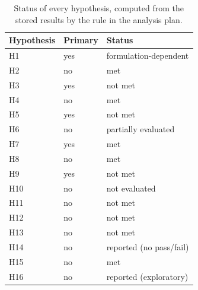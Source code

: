 \begin{table}[t]
\centering\small
\begin{tabular}{llp{5cm}}
\toprule
Hypothesis & Primary & Status \\
\midrule
H1 & yes & formulation-dependent \\
H2 & no & met \\
H3 & yes & not met \\
H4 & no & met \\
H5 & yes & not met \\
H6 & no & partially evaluated \\
H7 & yes & met \\
H8 & no & met \\
H9 & yes & not met \\
H10 & no & not evaluated \\
H11 & no & not met \\
H12 & no & not met \\
H13 & no & not met \\
H14 & no & reported (no pass/fail) \\
H15 & no & met \\
H16 & no & reported (exploratory) \\
\bottomrule
\end{tabular}
\caption{Status of every hypothesis, computed from the stored results by the rule in the analysis plan.}
\label{tab:hypotheses}
\end{table}
